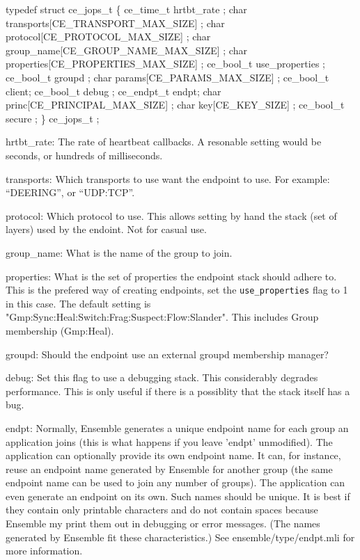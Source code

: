 \begin{codebox}
typedef struct ce_jops_t \{
    ce_time_t hrtbt_rate ;                     
    char transports[CE_TRANSPORT_MAX_SIZE] ;   
    char protocol[CE_PROTOCOL_MAX_SIZE] ;      
    char group_name[CE_GROUP_NAME_MAX_SIZE] ;  
    char properties[CE_PROPERTIES_MAX_SIZE] ;  
    ce_bool_t use_properties ;                 
    ce_bool_t groupd ;                         
    char params[CE_PARAMS_MAX_SIZE] ;          
    ce_bool_t client;                          
    ce_bool_t debug ;                          
    ce_endpt_t endpt;                          
    char princ[CE_PRINCIPAL_MAX_SIZE] ;       
    char key[CE_KEY_SIZE] ;                   
    ce_bool_t secure ;                        
\} ce_jops_t ;
\end{codebox}

\begin{description}
\item{hrtbt\_rate:} The rate of heartbeat callbacks. A resonable
  setting would be seconds, or hundreds of milliseconds. 
\item{transports:} Which transports to use want the endpoint to
  use. For example:  ``DEERING'', or ``UDP:TCP''.
\item{protocol:} Which protocol to use. This allows setting by hand
  the stack (set of layers) used by the endoint. Not for casual use.
\item{group\_name:} What is the name of the group to join. 
\item{properties:} What is the set of properties the endpoint stack
  should adhere to. This is the prefered way of creating endpoints,
  set the {\tt use\_properties} flag to 1 in this case. The default
  setting is "Gmp:Sync:Heal:Switch:Frag:Suspect:Flow:Slander". This
  includes Group membership (Gmp:Heal).
\item{groupd:} Should the endpoint use an external groupd membership
  manager?
\item {debug:} Set this flag to use a debugging stack. This
  considerably degrades performance. This is only useful if there is a
  possiblity that the stack itself has a bug. 
\item {endpt:}
  Normally, Ensemble generates a unique endpoint name for each
  group an application joins (this is what happens if you leave
  'endpt' unmodified).  The application can optionally provide
  its own endpoint name.  It can, for instance, reuse an
  endpoint name generated by Ensemble for another group (the
  same endpoint name can be used to join any number of groups).
  The application can even generate an endpoint on its own.
  Such names should be unique.  It is best if they contain only
  printable characters and do not contain spaces because
  Ensemble my print them out in debugging or error messages.
  (The names generated by Ensemble fit these characteristics.)
  See ensemble/type/endpt.mli for more information.


\end{description}
